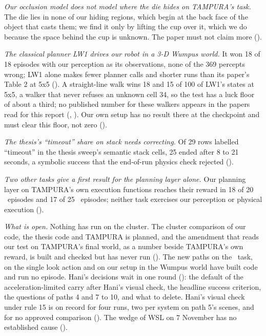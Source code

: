 \begin{summary}
\emph{Our occlusion model does not model where the die hides on TAMPURA's task.}
The die lies in none of our hiding regions, which begin at the back face of the
object that casts them; we find it only by lifting the cup over it, which we do
because the space behind the cup is unknown. The paper must not claim more
().

\emph{The classical planner LW1 drives our robot in a 3-D Wumpus world.} It won 18
of 18 episodes with our perception as its observations, none of the 369 percepts
wrong; LW1 alone makes fewer planner calls and shorter runs than its paper's
Table 2 at 5x5 (). A straight-line walk wins 18 and 15 of 100 of LW1's
states at 5x5, a walker that never refuses an unknown cell 34, so the test has a luck
floor of about a third; no published number for these walkers appears in the papers
read for this report (, ). Our own setup has no result there
at the checkpoint and must clear this floor, not zero ().

\emph{The thesis's ``timeout'' share on stack needs correcting.} Of 29 rows
labelled ``timeout'' in the thesis sweep's semantic stack cells, 25 ended after 8
to 21 seconds, a symbolic success that the end-of-run physics check rejected
().

\emph{Two other tasks give a first result for the planning layer alone.} Our planning
layer on TAMPURA's own execution functions reaches their reward in 18 of 20 \cuncert\
episodes and 17 of 25 \slamcol\ episodes; neither task exercises our perception or
physical execution (\TK{2}).

\emph{What is open.} Nothing has run on the cluster. The cluster comparison of our
code, the thesis code and TAMPURA is planned, and the amendment that reads our test on
TAMPURA's final world, as a number beside TAMPURA's own reward, is built and checked
but has never run (\BF{70}). The
new paths on the \cuncert\ task, on the single look action and on our setup in
the Wumpus world have built code and run no episode. Hani's decisions wait in one
round (\Cref{ch:open-questions}): the default of the acceleration-limited carry after
Hani's visual check, the headline success criterion, the questions of paths 4 and 7 to 10,
and what to delete. Hani's visual check under rule 15 is on record for four runs, two per
system on path 5's scenes, and for no approved comparison (\Cref{sec:visual-check}). The
wedge of WSL on 7 November has no established cause (\BF{69}).
\end{summary}
